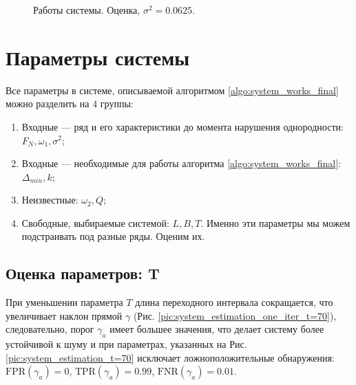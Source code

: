 \documentclass[specialist, substylefile = spbu.rtx,
			   subf, href, 12pt]{disser}
\begin{document}
\begin{figure}[!hhh]
	\caption{Работы системы. Оценка, $ \sigma^2=0.0625 $.}
	\label{pic:system_estimation_small_sd}
\end{figure}



\section{Параметры системы}\label{sec:system_parameters}

Все параметры в системе, описываемой алгоритмом \ref{algo:system_works_final} можно разделить на $ 4 $ группы:
\begin{enumerate}
	\item Входные --- ряд и его характеристики до момента нарушения однородности: $ F_N, \omega_1, \sigma^2 $;
	\item Входные --- необходимые для работы алгоритма \ref{algo:system_works_final}: $ \Delta_{min}, k $;
	\item Неизвестные: $ \omega_2, Q $;
	\item Свободные, выбираемые системой: $ L, B, T $. Именно эти параметры мы можем подстраивать под разные ряды. Оценим их.
\end{enumerate}

\subsection{Оценка параметров: T}

При уменьшении параметра $ T $ длина переходного интервала сокращается, что увеличивает наклон прямой $ \gamma $ (Рис. \ref{pic:system_estimation_one_iter_t=70}), следовательно, порог $ \gamma_a $ имеет большее значения, что делает систему более устойчивой к шуму и при параметрах, указанных на Рис. \ref{pic:system_estimation_t=70} исключает ложноположительные обнаружения: $ \mathrm{FPR}(\gamma_a) = 0 $, $ \mathrm{TPR}(\gamma_a) = 0.99 $,  $ \mathrm{FNR}(\gamma_a) = 0.01 $.
\end{document}
